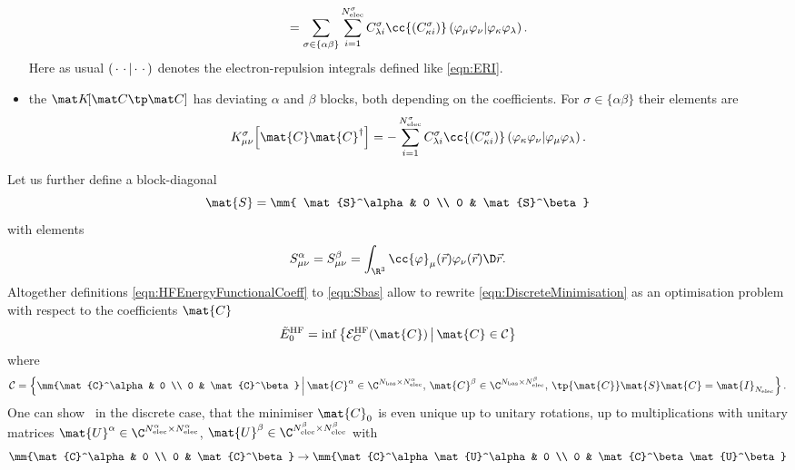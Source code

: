 \begin{rem}
\begin{itemize}
\begin{equation}
					= \sum_{\sigma\in\{\alpha\beta\}}
						\sum_{i=1}^{N_\text{elec}^\sigma}
						C^\sigma_{\lambda i}
						\cc{\left(C^\sigma_{\kappa i}\right)}
						\eriMu{\varphi_{\mu} \varphi_{\nu}}
							{\varphi_{\kappa} \varphi_{\lambda}}.
				\label{eqn:Jbas}
			\end{equation}
			Here as usual $\left( \,\cdot\, \,\cdot\, \middle| \,\cdot\, \,\cdot\, \right)$
			denotes the electron-repulsion integrals defined like \eqref{eqn:ERI}.
		\item the  $\matKfull$ has
			deviating $\alpha$ and $\beta$ blocks,
			both depending on the coefficients.
			For $\sigma \in \{\alpha\beta\}$ their elements are
			\begin{equation}
				K_{\mu\nu}^\sigma\!\left[\mat{C}\mat{C}^\dagger\right]
					= - \sum_{i=1}^{N_\text{elec}^\sigma}
						C^\sigma_{\lambda i}
						\cc{\left(C^\sigma_{\kappa i}\right)}
						\eriMu{\varphi_{\kappa} \varphi_{\nu}}
							{\varphi_{\mu} \varphi_{\lambda}}.
				\label{eqn:Kbas}
			\end{equation}
	\end{itemize}
	Let us further define a block-diagonal 
	\[ \mat{S} = \mm{ \mat{S}^\alpha & 0 \\ 0 & \mat{S}^\beta} \]
	with elements
	\begin{equation}
		S^\alpha_{\mu\nu} = S^\beta_{\mu\nu} = \int_{\R^3} \cc{\varphi}_\mu(\vec{r})
			\varphi_{\nu}(\vec{r})\D\vec{r}.
		\label{eqn:Sbas}
	\end{equation}
	Altogether definitions \eqref{eqn:HFEnergyFunctionalCoeff}
	to \eqref{eqn:Sbas} allow to rewrite \eqref{eqn:DiscreteMinimisation}
	as an optimisation problem with respect to the coefficients $\mat{C}$
	\begin{equation}
		\tilde{E}_0^\text{HF} = \inf \left\{
			\Ehf_C(\mat{C}) \, \middle| \, \mat{C} \in \mathcal{C}
		\right\}
		\label{eqn:HFOptCoeff}
	\end{equation}
	where
	\begin{equation}
		\mathcal{C} = \left\{
			\mm{\mat{C}^\alpha & 0 \\ 0 & \mat{C}^\beta}
			\, \middle| \,
			\mat{C}^\alpha \in \C^{\Nbas\times\NelecA}, \,
			\mat{C}^\beta \in \C^{\Nbas\times\NelecB}, \,
			\tp{\mat{C}} \mat{S} \mat{C} = \mat{I}_{\Nelec}
			\right\}.
		\label{eqn:HFStiefel}
	\end{equation}
	One can show~\cite{Cances2000} in the discrete case,
	that the minimiser $\mat{C}_0$ is even unique
	up to unitary rotations, \ie up to multiplications with unitary matrices
	$\mat{U}^\alpha \in \C^{\NelecA\times\NelecA}$,
	$\mat{U}^\beta \in \C^{\NelecB\times\NelecB}$ with
	\[ \mm{\mat{C}^\alpha & 0 \\ 0 & \mat{C}^\beta}
		\to \mm{\mat{C}^\alpha\mat{U}^\alpha & 0 \\ 0 & \mat{C}^\beta\mat{U}^\beta} \]


\end{rem}
